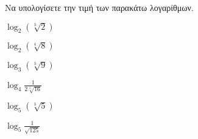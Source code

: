 Να υπολογίσετε την τιμή των παρακάτω λογαρίθμων.
\begin{multicols}{3}
\begin{rlist}[leftmargin=2mm]
\item $ \log_{2}{(\sqrt[3]{2})} $
\item $ \log_{2}{(\sqrt[4]{8})} $
\item $ \log_{3}{(\sqrt[3]{9})} $
\item $ \log_{4}{\frac{1}{2\sqrt[5]{16}}} $
\item $ \log_{5}{(\sqrt[3]{5})} $
\item $ \log_{5}{\frac{1}{\sqrt{125}}} $
\end{rlist}
\end{multicols}

